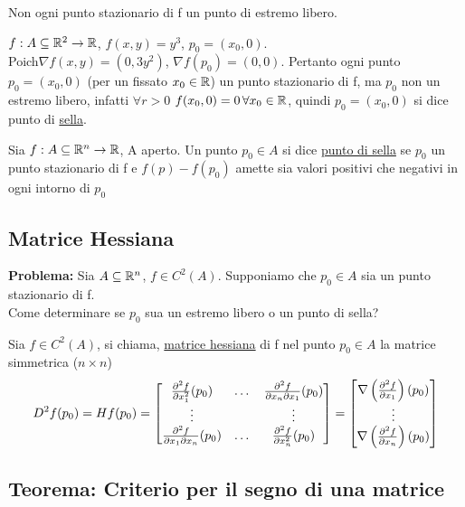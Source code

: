 \begin{osservazione}
  Non ogni punto stazionario di f \ace un punto di estremo libero.
\end{osservazione}
\begin{example}
  $f: A \subseteq \mathbb{R}^2 \to \mathbb{R}$, $f(x,y) = y^3$, $p_0 = (x_0,0)$. \\
  Poich\ace $\nabla f(x,y) = (0,3y^2)$, $\nabla f(p_0) = (0,0)$. Pertanto ogni punto $p_0 = (x_0,0)$ (per un fissato 
  $x_0\in \mathbb{R}$) \ace un punto stazionario di f, ma $p_0$ non \ace un estremo libero, infatti $\forall r > 0$ $f(x_0,0) = 0 \, 
  \forall x_0 \in \mathbb{R}$, quindi $p_0=(x_0,0)$ si dice punto di \underline{sella}.
\end{example}
\begin{definition}
  Sia $f: A \subseteq \mathbb{R}^n \to \mathbb{R}$, A aperto. Un punto $p_0 \in A$ si dice \underline{punto di sella} se $p_0$ \ace un punto 
  stazionario di f e $f(p)-f(p_0)$ amette sia valori positivi che negativi in ogni intorno di $p_0$
\end{definition}
\subsection{Matrice Hessiana}
\textbf{Problema:} Sia $A \subseteq \mathbb{R}^n$, $f \in C^2(A)$. Supponiamo che $p_0 \in A$ sia un punto stazionario di f. \\
Come determinare se $p_0$ sua un estremo libero o un  punto di sella?
\begin{definition} 
  Sia $f \in C^2(A)$, si chiama, \underline{matrice hessiana} di f nel punto $p_0\in A$ la matrice simmetrica ($n\times n$)
  $$D^2f(p_0) = H f(p_0) = \begin{bmatrix}
    \frac{\partial^2 f}{\partial x_1^2}(p_0) & \dots & \frac{\partial^2 f}{\partial x_n \partial x_1}(p_0) \\
    \vdots & & \vdots \\
    \frac{\partial^2 f}{\partial x_1 \partial x_n}(p_0) & \dots & \frac{\partial^2 f}{\partial x_n^2}(p_0) \\
  \end{bmatrix} = \begin{bmatrix}
    \nabla \left(\frac{\partial^2 f}{\partial x_1}\right)(p_0) \\
    \vdots \\
    \nabla \left(\frac{\partial^2 f}{\partial x_n}\right)(p_0)
  \end{bmatrix}$$
\end{definition}
\subsection{Teorema: Criterio per il segno di una matrice}

